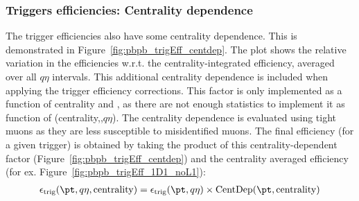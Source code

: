 \FloatBarrier
\subsubsection{Triggers efficiencies: Centrality dependence~\label{sec:trigeff_centdep}}
The trigger efficiencies also have some centrality dependence.
This is demonstrated in Figure~\ref{fig:pbpb_trigEff_centdep}.
The plot shows the relative variation in the efficiencies w.r.t. 
  the centrality-integrated efficiency, averaged over all $q\eta$ intervals.
This additional centrality dependence is included when applying the 
  trigger efficiency corrections.
This factor is only implemented as a function of centrality and \pt, as there are 
  not enough statistics to implement it as function of (centrality,\pt,$q\eta$).
The centrality dependence is evaluated using tight muons as they are less susceptible
  to misidentified muons.
The final efficiency (for a given trigger) is obtained by taking the product 
  of this centrality-dependent factor (Figure~\ref{fig:pbpb_trigEff_centdep})
  and the centrality averaged efficiency (for ex. Figure~\ref{fig:pbpb_trigEff_1D1_noL1}):
\begin{align}
	\epsilon_{\mathrm{trig}}(\pt,q\eta,\mathrm{centrality}) = \epsilon_{\mathrm{trig}}(\pt,q\eta)\times\mathrm{CentDep}(\pt,\mathrm{centrality})
\label{eq:trigeff_centdep}
\end{align}

